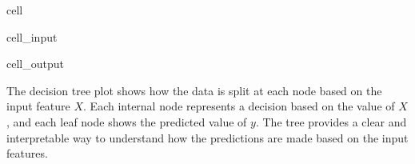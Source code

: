 \documentclass[letterpaper,10pt,english]{jupyterBook}
\begin{document}
\begin{sphinxuseclass}{cell}
\begin{sphinxVerbatimInput}
\begin{sphinxuseclass}{cell_input}
\end{sphinxuseclass}\end{sphinxVerbatimInput}
\begin{sphinxVerbatimOutput}

\begin{sphinxuseclass}{cell_output}
\noindent{}

\end{sphinxuseclass}\end{sphinxVerbatimOutput}

\end{sphinxuseclass}
\sphinxAtStartPar
The decision tree plot shows how the data is split at each node based on the input feature \(X\). Each internal node represents a decision based on the value of \(X\), and each leaf node shows the predicted value of \(y\). The tree provides a clear and interpretable way to understand how the predictions are made based on the input features.
\end{document}
